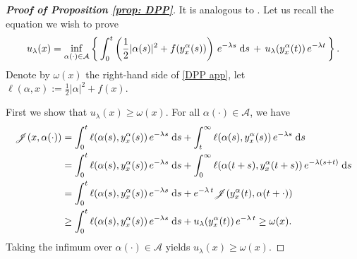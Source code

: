 \documentclass[12pt]{amsart}
\newcommand{\D}[1]{\mbox{\rm #1}}
\newcommand{\dd}{\D{d}}
\numberwithin{equation}{section}
\theoremstyle{plain}
\begin{document}

\begin{proof}[\textbf{Proof of Proposition \ref{prop: DPP}}]
It is analogous to \cite[Proposition III.2.5, p.102]{bardi1997optimal}. 
Let us recall the equation we wish to prove
\begin{equation}\label{DPP app}
    u_{\lambda}(x) = \inf\limits_{\alpha(\cdot)\in \mathcal{A}} \left\{\, \int_{0}^{t} \left(\frac{1}{2}|\alpha(s)|^{2} + f(y_{x}^{\alpha}(s))\right)\, e^{-\lambda s}\;\dd s \, + \, u_{\lambda}(y_{x}^{\alpha}(t))\,e^{-\lambda t} \,\right\}.
\end{equation}
Denote by $\omega(x)$ the right-hand side of \eqref{DPP app}, let $\ell(\alpha,x) := \frac{1}{2}|\alpha|^{2} + f(x)$. 

First we show that $u_{\lambda}(x) \geq \omega(x)$. 
For all $\alpha(\cdot)\in \mathcal{A}$, we have
\begin{equation*}
\begin{aligned}
    \mathscr{J}(x,\alpha(\cdot)) 
    & = \int_{0}^{t} \ell(\alpha(s), y_{x}^{\alpha}(s))\, e^{-\lambda s}\;\dd s + \int_{t}^{\infty} \ell(\alpha(s), y_{x}^{\alpha}(s))\, e^{-\lambda s}\;\dd s\\
    & = \int_{0}^{t} \ell(\alpha(s), y_{x}^{\alpha}(s))\, e^{-\lambda s}\;\dd s + \int_{0}^{\infty} \ell(\alpha(t+s), y_{x}^{\alpha}(t+s))\, e^{-\lambda (s+t)}\;\dd s\\
    & = \int_{0}^{t} \ell(\alpha(s), y_{x}^{\alpha}(s))\, e^{-\lambda s}\;\dd s + e^{-\lambda\,t} \mathscr{J}(y_{x}^{\alpha}(t), \alpha(t+\cdot))\\
    & \geq  \int_{0}^{t} \ell(\alpha(s), y_{x}^{\alpha}(s))\, e^{-\lambda s}\;\dd s +  u_{\lambda}(y_{x}^{\alpha}(t))\,e^{-\lambda\,t} \geq  \omega(x).
\end{aligned}
\end{equation*}
Taking the infimum over $\alpha(\cdot)\in\mathcal{A}$ yields $u_{\lambda}(x)\geq \omega(x)$.


\end{proof}
\end{document}
